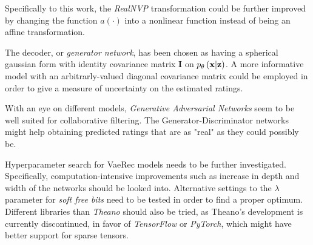Specifically to this work, the \emph{RealNVP} transformation 
could be further improved by changing the function $a(\cdot)$ into
a nonlinear function instead of being an affine transformation.

The decoder, or \emph{generator network}, has been chosen as having a spherical
gaussian form with identity covariance matrix $\mathbf{I}$ on $p_\theta\left(\mathbf{x}|\mathbf{z}\right)$. 
A more informative model
with an arbitrarly-valued diagonal covariance matrix could be employed
in order to give a measure of uncertainty on the estimated ratings.

With an eye on different models, 
\emph{Generative Adversarial Networks} \cite{GAN} seem to be well suited 
for collaborative filtering. The Generator-Discriminator networks might help
obtaining predicted ratings that are as "real" as they could possibly be.

Hyperparameter search for VaeRec models needs to be further
investigated. Specifically, computation-intensive improvements
such as increase in depth and width of the networks should be looked into.
Alternative settings to the $\lambda$ parameter for \emph{soft free bits}
need to be tested in order to find a proper optimum.
Different libraries than \emph{Theano}\cite{theano} should also be tried, as Theano's
development is currently discontinued, in favor of \emph{TensorFlow}\cite{tensorflow}
or \emph{PyTorch}\cite{pytorch}, which might have better support for sparse tensors.
